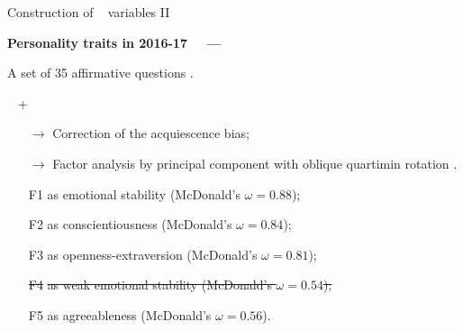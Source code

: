 \documentclass[aspectratio=169]{beamer}
\begin{document}
\begin{frame}{Construction of \PTCS~ variables II}
\label{frame:construction2}

\textbf{Personality traits in 2016-17 ~~---}
\vspace*{0.2em}

A set of 35 affirmative questions \citep{John1999}.

~ \hfill \hyperlink{frame:questions}{} +  \hyperlink{frame:compconst}{} \hfill ~

\begin{itemize}
\item[$\rightarrow$] Correction of the acquiescence bias; 
\item[$\rightarrow$] Factor analysis by principal component with oblique quartimin rotation \citep{Laajaj2019b}.
\item[F1] as emotional stability (McDonald's $\omega=0.88$);
\item[F2] as conscientiousness (McDonald's $\omega=0.84$);
\item[F3] as openness-extraversion (McDonald's $\omega=0.81$);
\item[\st{F4}]\st{as weak emotional stability (McDonald's $\omega=0.54$);}
\item[F5] as agreeableness (McDonald's $\omega=0.56$).
\end{itemize}

\end{frame}






\end{document}
